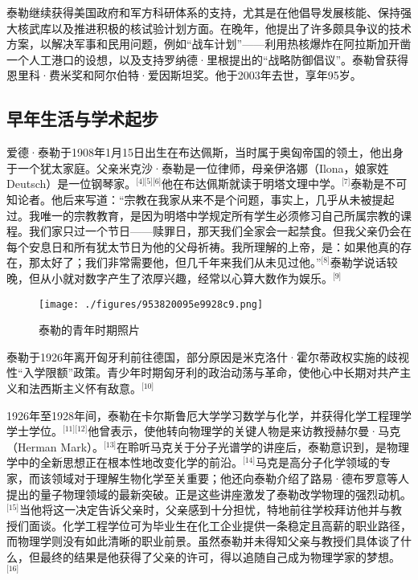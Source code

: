 泰勒继续获得美国政府和军方科研体系的支持，尤其是在他倡导发展核能、保持强大核武库以及推进积极的核试验计划方面。在晚年，他提出了许多颇具争议的技术方案，以解决军事和民用问题，例如“战车计划”——利用热核爆炸在阿拉斯加开凿一个人工港口的设想，以及支持罗纳德·里根提出的“战略防御倡议”。泰勒曾获得恩里科·费米奖和阿尔伯特·爱因斯坦奖。他于2003年去世，享年95岁。
\subsection{早年生活与学术起步}
爱德·泰勒于1908年1月15日出生在布达佩斯，当时属于奥匈帝国的领土，他出身于一个犹太家庭。父亲米克沙·泰勒是一位律师，母亲伊洛娜（Ilona，娘家姓Deutsch）是一位钢琴家。\(^\text{[4][5][6]}\)他在布达佩斯就读于明塔文理中学。\(^\text{[7]}\)泰勒是不可知论者。他后来写道：“宗教在我家从来不是个问题，事实上，几乎从未被提起过。我唯一的宗教教育，是因为明塔中学规定所有学生必须修习自己所属宗教的课程。我们家只过一个节日——赎罪日，那天我们全家会一起禁食。但我父亲仍会在每个安息日和所有犹太节日为他的父母祈祷。我所理解的上帝，是：如果他真的存在，那太好了；我们非常需要他，但几千年来我们从未见过他。”\(^\text{[8]}\)泰勒学说话较晚，但从小就对数字产生了浓厚兴趣，经常以心算大数作为娱乐。\(^\text{[9]}\)
\begin{figure}[ht]
\centering
\texttt{[image: ./figures/953820095e9928c9.png]}
\caption{泰勒的青年时期照片} \label{fig_ADHTL_2}
\end{figure}
泰勒于1926年离开匈牙利前往德国，部分原因是米克洛什·霍尔蒂政权实施的歧视性“入学限额”政策。青少年时期匈牙利的政治动荡与革命，使他心中长期对共产主义和法西斯主义怀有敌意。\(^\text{[10]}\)

1926年至1928年间，泰勒在卡尔斯鲁厄大学学习数学与化学，并获得化学工程理学学士学位。\(^\text{[11][12]}\)他曾表示，使他转向物理学的关键人物是来访教授赫尔曼·马克（Herman Mark）。\(^\text{[13]}\)在聆听马克关于分子光谱学的讲座后，泰勒意识到，是物理学中的全新思想正在根本性地改变化学的前沿。\(^\text{[14]}\)马克是高分子化学领域的专家，而该领域对于理解生物化学至关重要；他还向泰勒介绍了路易·德布罗意等人提出的量子物理领域的最新突破。正是这些讲座激发了泰勒改学物理的强烈动机。\(^\text{[15]}\)当他将这一决定告诉父亲时，父亲感到十分担忧，特地前往学校拜访他并与教授们面谈。化学工程学位可为毕业生在化工企业提供一条稳定且高薪的职业路径，而物理学则没有如此清晰的职业前景。虽然泰勒并未得知父亲与教授们具体谈了什么，但最终的结果是他获得了父亲的许可，得以追随自己成为物理学家的梦想。\(^\text{[16]}\)


